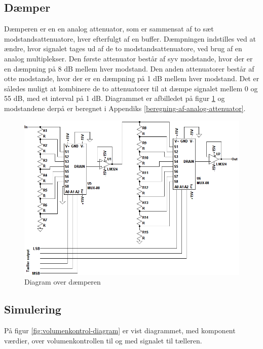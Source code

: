 \subsection*{Dæmper}
\label{volumenkontrol-design-daemper}
Dæmperen er en en analog attenuator, som er sammensat af to sæt modstandsattenuatore, hver efterfulgt af en buffer. Dæmpningen indstilles ved at ændre, hvor signalet tages ud af de to modstandsattenuatore, ved brug af en analog multiplekser. Den første attenuator består af syv modstande, hvor der er en dæmpning på 8 dB mellem hver modstand. Den anden attenuatorer består af otte modstande, hvor der er en dæmpning på 1 dB mellem hver modstand. Det er således muligt at kombinere de to attenuatorer til at dæmpe signalet mellem 0 og 55 dB, med et interval på 1 dB. Diagrammet er afbilledet på figur \ref{fig:volumenkontrol_daemper} og modstandene derpå er beregnet i Appendiks \ref{beregning-af-analog-attenuator}.

\begin{figure}[h]
\centering
\includegraphics[width=\textwidth]{teknisk/volumenkontrol/daemper.png}
\caption{Diagram over dæmperen}
\label{fig:volumenkontrol_daemper}
\end{figure}

\clearpage
\subsection{Simulering}
\label{volumenkontrol-simulering}

På figur \ref{fig:volumenkontrol-diagram} er vist diagrammet, med komponent værdier, over volumenkontrollen til og med signalet til tælleren.

